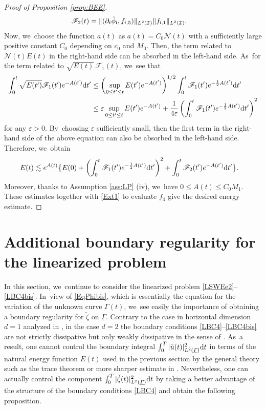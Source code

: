 \documentclass[JEP,XML,SOM,Unicode,NoFloatCountersInSection,published]{cedram}
\let\epsilon\varepsilon
\newcommand{\dt}{\partial_t}
\newcommand{\cI}{{\mathcal I}}
\newcommand{\ul}[1]{\underline{#1}}
\newcommand{\itGamma}{\mathit{\Gamma}}
\theoremstyle{definition}
\begin{document}
\begin{proof}[Proof of Proposition \ref{prop:BEE}]
\begin{align*}
\mathscr{F}_2(t)
&= \|(\dt\check{\phi}_\mathrm{i},f_{i,5})\|_{L^2(\cI)}\|f_{{\rm i},1}\|_{L^2(\cI)}.
\end{align*}
Now, we~choose the function $a(t)$ as $a(t)=C_0\mathscr{N}(t)$ with a sufficiently large positive constant $C_0$ depending on $c_0$ and $M_0$.
Then, the term related to $\mathscr{N}(t)E(t)$ in the right-hand side can be absorbed in the left-hand side. As~for the term related to $\sqrt{E(t)}\,\mathscr{F}_1(t)$, we~see that
\begin{align*}
\int_0^t \sqrt{E(t')}\mathscr{F}_1(t')e^{-A(t')} {\rm d}t'
&\leq \left(\sup_{0\leq t'\leq t} E(t')e^{-A(t')} \right)^{1/2}\int_0^t \mathscr{F}_1(t')e^{-\frac12A(t')}{\rm d}t' \\
&\leq \epsilon \sup_{0\leq t'\leq t} E(t')e^{-A(t')} + \frac{1}{4\epsilon}\left(\int_0^t \mathscr{F}_1(t')e^{-\frac12A(t')}{\rm d}t' \right)^2
\end{align*}
for any $\epsilon>0$. By~choosing $\epsilon$ sufficiently small, then the first term in the right-hand side of the above equation can also be absorbed in the left-hand side.
Therefore, we~obtain
\begin{align*}
E(t) &\lesssim e^{A(t)} \bigl\{ E(0) + \left(\int_0^t \mathscr{F}_1(t')e^{-\frac12A(t')}{\rm d}t' \right)^2
+ \int_0^t \mathscr{F}_2(t')e^{-A(t')} {\rm d}t' \bigr\}.
\end{align*}
Moreover, thanks to Assumption \ref{ass:LP} (iv), we~have $0\leq A(t)\leq C_0M_1$.
These estimates together with \eqref{Ext1} to evaluate $f_4$ give the desired energy estimate.
\end{proof}

\section{Additional boundary regularity for the linearized problem}\label{sect:AddBR}
In this section, we~continue to consider the linearized problem \eqref{LSWEe2}--\eqref{LBC4bis}. In~view of \eqref{EqPhibis}, which is essentially the equation for the variation of the unknown curve $\itGamma(t)$, we~see easily the importance of obtaining a boundary regularity for $\check{\zeta}$ on $\ul{\itGamma}$.
Contrary to the case in horizontal dimension $d=1$ analyzed in \cite{IguchiLannes2021},
in the case $d=2$ the boundary conditions \eqref{LBC4}--\eqref{LBC4bis} are not strictly dissipative but only weakly dissipative
in the sense of \cite{IguchiLannes2023}. As~a result, one cannot control the boundary integral $\int_0^T|\check{u}(t)|_{L^2(\ul{\itGamma})}^2 {\rm d}t$ in terms of the natural energy function $E(t)$
used in the previous section by the general theory such as the trace theorem or more sharper estimate in \cite{Tataru1998}.
Nevertheless, one can actually control the component $\int_0^T|\check{\zeta}(t)|_{L^2(\ul{\itGamma})}^2 {\rm d}t$ by taking a better advantage of the structure
of the boundary conditions \eqref{LBC4} and obtain the following proposition.
\end{document}
